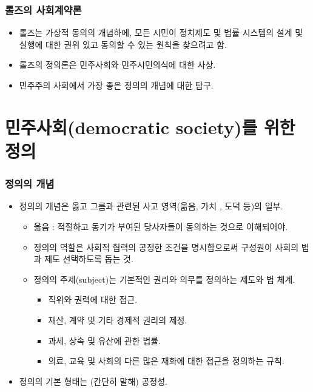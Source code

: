 \documentclass[aspectratio=169,xcolor=dvipsnames,handout]{beamer}
\begin{document}
\begin{frame}[<+->]
\frametitle{롤즈의 사회계약론}
    \begin{itemize}
        \item 롤즈는 가상적 동의의 개념하에, 모든 시민이 정치제도 및 법률 시스템의 설계 및 실행에 대한 권위 있고 동의할 수 있는 원칙을 찾으려고 함.
        \item 롤즈의 정의론은 민주사회와 민주시민의식에 대한 사상.
        \item 민주주의 사회에서 가장 좋은 정의의 개념에 대한 탐구.
    \end{itemize}
\end{frame}

\section{민주사회(democratic society)를 위한 정의}
\begin{frame}[<+->]
\frametitle{정의의 개념}
    \begin{itemize}
        \item 정의의 개념은 옳고 그름과 관련된 사고 영역(옮음, 가치 , 도덕 등)의 일부.
        \begin{itemize}
            \item 옮음 : 적절하고 동기가 부여된 당사자들이 동의하는 것으로 이해되어야.
        \end{itemize}
        \begin{itemize}
            \item  정의의 역할은 사회적 협력의 공정한 조건을 명시함으로써 구성원이 사회의 법과 제도 선택하도록 돕는 것.
            \item  정의의 주제(subject)는 기본적인 권리와 의무를 정의하는 제도와 법 체계. 
            \begin{itemize}
                \item 직위와 권력에 대한 접근. 
                \item 재산, 계약 및 기타 경제적 권리의 제정.
                \item 과세, 상속 및 유산에 관한 법률.
                \item 의료, 교육 및 사회의 다른 많은 재화에 대한 접근을 정의하는 규칙.
            \end{itemize}
        \end{itemize}
        \item  정의의 기본 형태는 (간단히 말해) 공정성.
    \end{itemize}
\end{frame}
\end{document}
